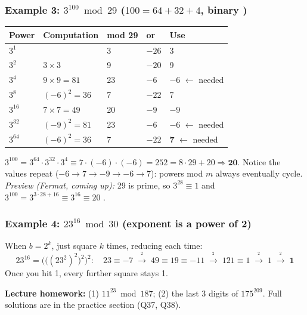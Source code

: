 \subsubsection*{Example 3: $3^{100} \bmod 29$ \quad ($100 = 64 + 32 + 4$, binary )}
\begin{center}\small
\begin{tabular}{@{}lllll@{}}
\toprule
Power & Computation & mod 29 & or & Use\\
\midrule
$3^1$ & & 3 & $-26$ & 3\\
$3^2$ & $3 \times 3$ & 9 & $-20$ & 9\\
$3^4$ & $9 \times 9 = 81$ & 23 & $-6$ & \textbf{$-6$} $\leftarrow$ needed\\
$3^8$ & $(-6)^2 = 36$ & 7 & $-22$ & 7\\
$3^{16}$ & $7 \times 7 = 49$ & 20 & $-9$ & $-9$\\
$3^{32}$ & $(-9)^2 = 81$ & 23 & $-6$ & \textbf{$-6$} $\leftarrow$ needed\\
$3^{64}$ & $(-6)^2 = 36$ & 7 & $-22$ & \textbf{7} $\leftarrow$ needed\\
\bottomrule
\end{tabular}
\end{center}
$3^{100} = 3^{64}\cdot3^{32}\cdot3^4 \equiv 7 \cdot (-6) \cdot (-6) = 252 = 8\cdot29 + 20 \Rightarrow \mathbf{20}$.
Notice the values repeat ($-6 \to 7 \to -9 \to -6 \to 7$): powers mod $m$ always eventually cycle.
{\small\emph{Preview (Fermat, coming up):} 29 is prime, so $3^{28} \equiv 1$ and $3^{100} = 3^{3\cdot28 + 16} \equiv 3^{16} \equiv 20$ \checkmark.}

\subsubsection*{Example 4: $23^{16} \bmod 30$ (exponent is a power of 2)}
When $b = 2^k$, just square $k$ times, reducing each time:
\[
23^{16} = \Big(\big((23^2)^2\big)^2\Big)^2:\quad 23 \equiv -7 \;\xrightarrow{\;^2\;}\; 49 \equiv 19 \equiv -11 \;\xrightarrow{\;^2\;}\; 121 \equiv 1 \;\xrightarrow{\;^2\;}\; 1 \;\xrightarrow{\;^2\;}\; \mathbf{1}
\]
Once you hit 1, every further square stays 1.

\textbf{Lecture homework:} (1) $11^{23} \bmod 187$; (2) the last 3 digits of $175^{209}$. Full solutions are in the practice section (Q37, Q38).

